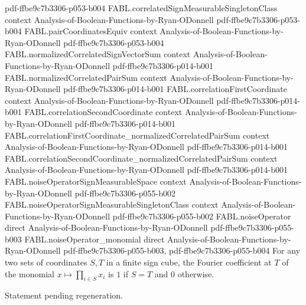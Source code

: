 \begin{theorem}
  {pdf-ffbe9c7b3306-p053-b004}
\proofstep
  {FABL.correlatedSignMeasurableSingletonClass}
  {context}
  {Analysis-of-Boolean-Functions-by-Ryan-ODonnell}
  {pdf-ffbe9c7b3306-p053-b004}
\proofstep
  {FABL.pairCoordinatesEquiv}
  {context}
  {Analysis-of-Boolean-Functions-by-Ryan-ODonnell}
  {pdf-ffbe9c7b3306-p053-b004}
\proofstep
  {FABL.normalizedCorrelatedSignVectorSum}
  {context}
  {Analysis-of-Boolean-Functions-by-Ryan-ODonnell}
  {pdf-ffbe9c7b3306-p014-b001}
\proofstep
  {FABL.normalizedCorrelatedPairSum}
  {context}
  {Analysis-of-Boolean-Functions-by-Ryan-ODonnell}
  {pdf-ffbe9c7b3306-p014-b001}
\proofstep
  {FABL.correlationFirstCoordinate}
  {context}
  {Analysis-of-Boolean-Functions-by-Ryan-ODonnell}
  {pdf-ffbe9c7b3306-p014-b001}
\proofstep
  {FABL.correlationSecondCoordinate}
  {context}
  {Analysis-of-Boolean-Functions-by-Ryan-ODonnell}
  {pdf-ffbe9c7b3306-p014-b001}
\proofstep
  {FABL.correlationFirstCoordinate_normalizedCorrelatedPairSum}
  {context}
  {Analysis-of-Boolean-Functions-by-Ryan-ODonnell}
  {pdf-ffbe9c7b3306-p014-b001}
\proofstep
  {FABL.correlationSecondCoordinate_normalizedCorrelatedPairSum}
  {context}
  {Analysis-of-Boolean-Functions-by-Ryan-ODonnell}
  {pdf-ffbe9c7b3306-p014-b001}
\proofstep
  {FABL.noiseOperatorSignMeasurableSpace}
  {context}
  {Analysis-of-Boolean-Functions-by-Ryan-ODonnell}
  {pdf-ffbe9c7b3306-p055-b002}
\proofstep
  {FABL.noiseOperatorSignMeasurableSingletonClass}
  {context}
  {Analysis-of-Boolean-Functions-by-Ryan-ODonnell}
  {pdf-ffbe9c7b3306-p055-b002}
\proofstep
  {FABL.noiseOperator}
  {direct}
  {Analysis-of-Boolean-Functions-by-Ryan-ODonnell}
  {pdf-ffbe9c7b3306-p055-b003}
\proofstep
  {FABL.noiseOperator_monomial}
  {direct}
  {Analysis-of-Boolean-Functions-by-Ryan-ODonnell}
  {pdf-ffbe9c7b3306-p055-b003,
    pdf-ffbe9c7b3306-p055-b004}
For any two sets of coordinates $S,T$ in a finite sign cube, the Fourier coefficient at
$T$ of the monomial $x\mapsto\prod_{i\in S}x_i$ is $1$ if $S=T$ and $0$ otherwise.
\end{theorem}

\begin{theorem}
\label{FABL.noiseStability_monomial}
\leanok
{}
Statement pending regeneration.
\end{theorem}

